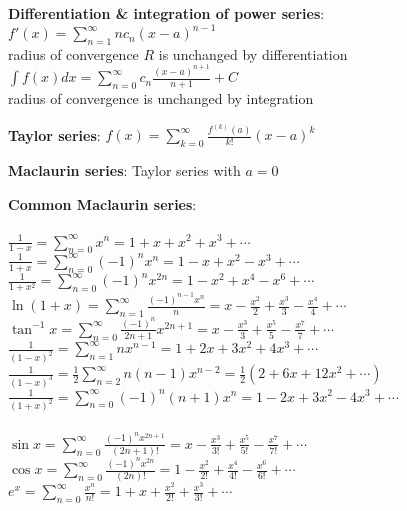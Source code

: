 \documentclass[a4paper,landscape]{article}
\newcommand{\rnname}[1]{\textbf{#1}}
\begin{document}
\begin{multicols*}{3}
\begin{flatitemize}
\item \rnname{Differentiation \& integration of power series}:
$\displaystyle f'(x) = \displaystyle \sum_{n=1}^{\infty} nc_n\left(x-a\right)^{n-1}$ \\ radius of convergence $R$ is unchanged by differentiation
$\displaystyle\int f(x) dx = \displaystyle \sum_{n=0}^{\infty} c_n\frac{\left(x-a\right)^{n+1}}{n+1}+C$ \\ radius of convergence is unchanged by integration
\item \rnname{Taylor series}: $\displaystyle f\left(x\right) = \sum_{k=0}^{\infty} \frac{f^{\left(k\right)}\left(a\right)}{k!}\left(x-a\right)^k$

\item \rnname{Maclaurin series}: Taylor series with $a=0$

\item \rnname{Common Maclaurin series}:\\
\underline{} \\
$\displaystyle \frac{1}{1-x} = \sum_{n=0}^{\infty} x^n = 1+x+x^2+x^3+\cdots$ \\
$\displaystyle \frac{1}{1+x} = \sum_{n=0}^{\infty} (-1)^nx^n = 1-x+x^2-x^3+\cdots$ \\
$\displaystyle \frac{1}{1+x^2} = \sum_{n=0}^{\infty} (-1)^nx^{2n} = 1-x^2+x^4-x^6+\cdots$ \\
$\displaystyle \ln\left(1+x\right) = \sum_{n=1}^{\infty} \frac{(-1)^{n-1}x^n}{n} = x-\frac{x^2}{2}+\frac{x^3}{3}-\frac{x^4}{4}+ \cdots$ \\
$\displaystyle \tan^{-1} x = \sum_{n=0}^{\infty} \frac{(-1)^n}{2n+1} x^{2n+1} = x - \frac{x^3}{3} + \frac{x^5}{5} - \frac{x^7}{7} + \cdots$ \\
$\displaystyle \frac{1}{(1-x)^2} = \sum_{n=1}^{\infty} nx^{n-1} = 1 + 2x + 3x^2 + 4x^3 +\cdots$ \\
$\displaystyle \frac{1}{(1-x)^3} = \frac{1}{2}\sum_{n=2}^{\infty} n(n-1)x^{n-2} = \frac{1}{2}(2+6x+12x^2+\cdots)$ \\
$\displaystyle \frac{1}{(1+x)^2} = \sum_{n=0}^{\infty} (-1)^n(n+1)x^{n} = 1 - 2x + 3x^2 - 4x^3 + \cdots$ \\
\underline{} \\
$\displaystyle \sin x = \sum_{n=0}^{\infty}\frac{(-1)^nx^{2n+1}}{(2n+1)!} = x-\frac{x^3}{3!}+\frac{x^5}{5!}-\frac{x^7}{7!}+\cdots$ \\
$\displaystyle \cos x = \sum_{n=0}^{\infty}\frac{(-1)^nx^{2n}}{(2n)!} = 1-\frac{x^2}{2!}+\frac{x^4}{4!}-\frac{x^6}{6!}+\cdots$ \\
$\displaystyle e^x = \sum_{n=0}^{\infty} \frac{x^n}{n!} = 1 + x + \frac{x^2}{2!} + \frac{x^3}{3!} + \cdots$


\end{flatitemize}
\end{multicols*}
\end{document}
